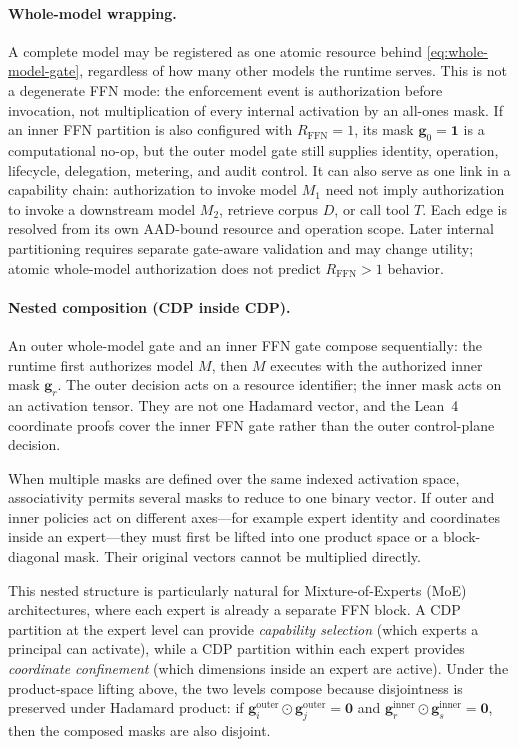 \documentclass[11pt,a4paper]{article}
\newcommand{\bg}{\mathbf{g}}
\begin{document}
\paragraph{Whole-model wrapping.}
A complete model may be registered as one atomic resource behind
\eqref{eq:whole-model-gate}, regardless of how many other models the
runtime serves.  This is not a degenerate FFN mode: the enforcement
event is authorization before invocation, not multiplication of every
internal activation by an all-ones mask.  If an inner FFN partition is
also configured with $R_{\mathrm{FFN}}{=}1$, its mask
$\bg_0=\mathbf 1$ is a computational no-op, but the outer model gate
still supplies identity, operation, lifecycle, delegation, metering,
and audit control.  It can also serve as one link in a capability
chain: authorization to invoke model $M_1$ need not imply authorization
to invoke a downstream model $M_2$, retrieve corpus $D$, or call tool
$T$.  Each edge is resolved from its own AAD-bound resource and
operation scope.
Later internal partitioning requires separate gate-aware validation
and may change utility; atomic whole-model authorization does not
predict $R_{\mathrm{FFN}}>1$ behavior.

\paragraph{Nested composition (CDP inside CDP).}
An outer whole-model gate and an inner FFN gate compose sequentially:
the runtime first authorizes model $M$, then $M$ executes with the
authorized inner mask $\bg_r$.  The outer decision acts on a resource
identifier; the inner mask acts on an activation tensor.  They are not
one Hadamard vector, and the Lean~4 coordinate proofs cover the inner
FFN gate rather than the outer control-plane decision.

When multiple masks are defined over the same indexed activation space,
associativity permits several masks to reduce to one binary vector.
If outer and inner policies act on different
axes---for example expert identity and coordinates inside an
expert---they must first be lifted into one product space or a
block-diagonal mask.  Their original vectors cannot be multiplied
directly.

This nested structure is particularly natural for
Mixture-of-Experts (MoE) architectures, where each expert is
already a separate FFN block.  A CDP partition at the expert level
can provide \emph{capability selection} (which experts a principal can
activate), while a CDP partition within each expert provides
\emph{coordinate confinement} (which dimensions inside an expert are
active).  Under the product-space lifting above, the two levels
compose because disjointness is preserved under Hadamard
product: if $\bg^{\mathrm{outer}}_i \odot \bg^{\mathrm{outer}}_j
= \mathbf{0}$ and $\bg^{\mathrm{inner}}_r \odot
\bg^{\mathrm{inner}}_s = \mathbf{0}$, then the composed masks are
also disjoint.
\end{document}
